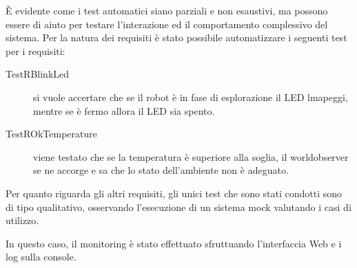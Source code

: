 È evidente come i test automatici siano parziali e non esaustivi, ma possono essere di aiuto per testare l'interazione ed il comportamento complessivo del sistema.
Per la natura dei requisiti è stato possibile automatizzare i seguenti test per i requisiti:

\begin{description}
  \item[TestRBlinkLed]
    si vuole accertare che se il robot è in fase di esplorazione il LED lmapeggi, mentre se è fermo allora il LED sia spento.
  \item[TestROkTemperature]
    viene testato che se la temperatura è superiore alla soglia, il worldobserver se ne accorge e sa che lo stato dell'ambiente non è adeguato.
\end{description}

Per quanto riguarda gli altri requisiti, gli unici test che sono stati condotti sono di tipo qualitativo, osservando l'esecuzione di un sistema mock valutando i casi di utilizzo.

In questo caso, il monitoring è stato effettuato sfruttuando l'interfaccia Web e i log sulla console.
